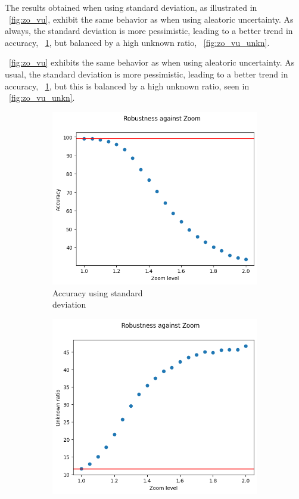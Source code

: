 The results obtained when using standard deviation, as illustrated in \Fig~\ref{fig:zo_vu}, exhibit the same behavior as when using aleatoric uncertainty. As always, the standard deviation is more pessimistic, leading to a better trend in accuracy, \Fig~\ref{fig:zo_vu_acc}, but balanced by a high unknown ratio, \Fig~\ref{fig:zo_vu_unkn}.

\Fig~\ref{fig:zo_vu} exhibits the same behavior as when using aleatoric uncertainty. As usual, the standard deviation is more pessimistic, leading to a better trend in accuracy, \Fig~\ref{fig:zo_vu_acc}, but this is balanced by a high unknown ratio, seen in \Fig~\ref{fig:zo_vu_unkn}.

\begin{figure}[h]
	\centering
	\begin{subfigure}{.33\textwidth}
		\centering
		\includegraphics[width=0.9\linewidth]{ImageFiles/EvalBNN/ZO/VU/acc}
		\caption{Accuracy using standard \\ deviation}
		\label{fig:zo_vu_acc}
	\end{subfigure}%
	\begin{subfigure}{.33\textwidth}
		\centering
		\includegraphics[width=0.9\linewidth]{ImageFiles/EvalBNN/ZO/VU/unkn}

\end{subfigure}
\end{figure}
